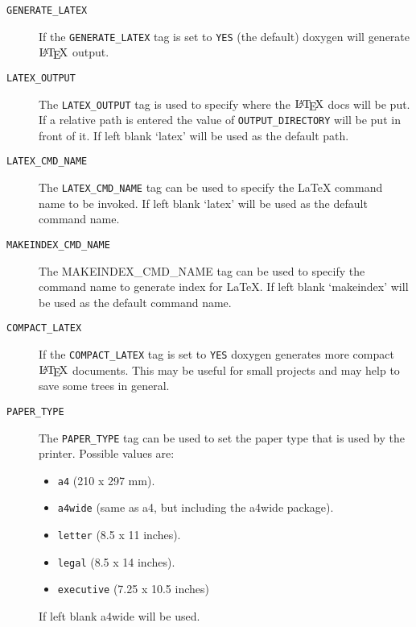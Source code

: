 \label{config_cfg_generate_latex}
\hypertarget{config_cfg_generate_latex}{}
 \begin{description}
\item[{\tt GENERATE\_\-LATEX} ] If the {\tt GENERATE\_\-LATEX} tag is set to {\tt YES} (the default) doxygen will generate $\mbox{\LaTeX}$ output.

\label{config_cfg_latex_output}
\hypertarget{config_cfg_latex_output}{}
 \item[{\tt LATEX\_\-OUTPUT} ] The {\tt LATEX\_\-OUTPUT} tag is used to specify where the $\mbox{\LaTeX}$ docs will be put. If a relative path is entered the value of {\tt OUTPUT\_\-DIRECTORY} will be put in front of it. If left blank `latex' will be used as the default path.

\label{config_cfg_latex_cmd_name}
\hypertarget{config_cfg_latex_cmd_name}{}
 \item[{\tt LATEX\_\-CMD\_\-NAME} ] The {\tt LATEX\_\-CMD\_\-NAME} tag can be used to specify the LaTeX command name to be invoked. If left blank `latex' will be used as the default command name.

\label{config_cfg_makeindex_cmd_name}
\hypertarget{config_cfg_makeindex_cmd_name}{}
 \item[{\tt MAKEINDEX\_\-CMD\_\-NAME} ] The MAKEINDEX\_\-CMD\_\-NAME tag can be used to specify the command name to generate index for LaTeX. If left blank `makeindex' will be used as the default command name.

\label{config_cfg_compact_latex}
\hypertarget{config_cfg_compact_latex}{}
 \item[{\tt COMPACT\_\-LATEX} ] If the {\tt COMPACT\_\-LATEX} tag is set to {\tt YES} doxygen generates more compact $\mbox{\LaTeX}$ documents. This may be useful for small projects and may help to save some trees in general.

\label{config_cfg_paper_type}
\hypertarget{config_cfg_paper_type}{}
 \item[{\tt PAPER\_\-TYPE} ] The {\tt PAPER\_\-TYPE} tag can be used to set the paper type that is used by the printer. Possible values are: \begin{itemize}
\item {\tt a4} (210 x 297 mm). \item {\tt a4wide} (same as a4, but including the a4wide package). \item {\tt letter} (8.5 x 11 inches). \item {\tt legal} (8.5 x 14 inches). \item {\tt executive} (7.25 x 10.5 inches) \end{itemize}
If left blank a4wide will be used.


\end{description}
